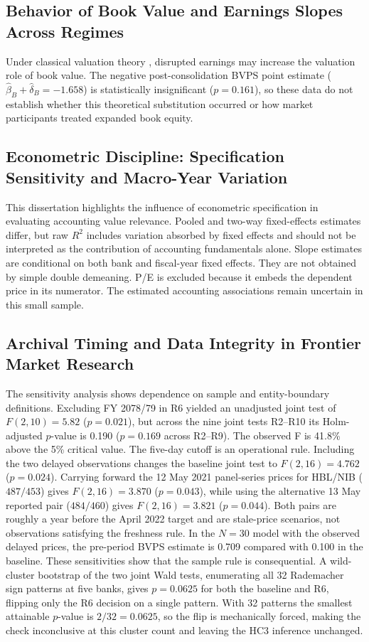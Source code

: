 \subsection{Behavior of Book Value and Earnings Slopes Across Regimes}
Under classical valuation theory \citep{ohlson1995,collins1997}, disrupted earnings may increase the valuation role of book value. The negative post-consolidation BVPS point estimate ($\hat{\beta}_B + \hat{\delta}_B=-1.658$) is statistically insignificant ($p=0.161$), so these data do not establish whether this theoretical substitution occurred or how market participants treated expanded book equity.

\subsection{Econometric Discipline: Specification Sensitivity and Macro-Year Variation}
This dissertation highlights the influence of econometric specification in evaluating accounting value relevance. Pooled and two-way fixed-effects estimates differ, but raw $R^2$ includes variation absorbed by fixed effects and should not be interpreted as the contribution of accounting fundamentals alone. Slope estimates are conditional on both bank and fiscal-year fixed effects. They are not obtained by simple double demeaning. P/E is excluded because it embeds the dependent price in its numerator. The estimated accounting associations remain uncertain in this small sample.

\subsection{Archival Timing and Data Integrity in Frontier Market Research}
The sensitivity analysis shows dependence on sample and entity-boundary definitions. Excluding FY 2078/79 in R6 yielded an unadjusted joint test of $F(2,10)=5.82$ ($p=0.021$), but across the nine joint tests R2--R10 its Holm-adjusted $p$-value is 0.190 ($p = 0.169$ across R2--R9). The observed F is 41.8\% above the 5\% critical value. The five-day cutoff is an operational rule. Including the two delayed observations changes the baseline joint test to $F(2,16)=4.762$ ($p=0.024$). Carrying forward the 12 May 2021 panel-series prices for HBL/NIB ($487/453$) gives $F(2,16)=3.870$ ($p=0.043$), while using the alternative 13 May reported pair ($484/460$) gives $F(2,16)=3.821$ ($p=0.044$). Both pairs are roughly a year before the April 2022 target and are stale-price scenarios, not observations satisfying the freshness rule. In the $N=30$ model with the observed delayed prices, the pre-period BVPS estimate is 0.709 compared with 0.100 in the baseline. These sensitivities show that the sample rule is consequential. A wild-cluster bootstrap of the two joint Wald tests, enumerating all 32 Rademacher sign patterns at five banks, gives $p = 0.0625$ for both the baseline and R6, flipping only the R6 decision on a single pattern. With 32 patterns the smallest attainable $p$-value is $2/32 = 0.0625$, so the flip is mechanically forced, making the check inconclusive at this cluster count and leaving the HC3 inference unchanged.

